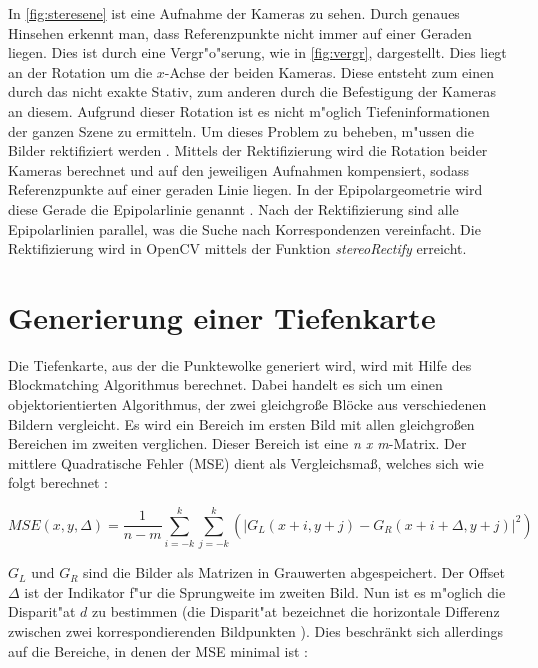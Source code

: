 \noindent In \ref{fig:steresene} ist eine Aufnahme der Kameras zu sehen. Durch genaues Hinsehen erkennt man, dass Referenzpunkte nicht immer auf einer Geraden liegen. Dies ist durch eine Vergr"o"serung, wie in \ref{fig:vergr}, dargestellt. Dies liegt an der Rotation um die $x$-Achse der beiden Kameras. Diese entsteht zum einen durch das nicht exakte Stativ, zum anderen durch die Befestigung der Kameras an diesem. Aufgrund dieser Rotation ist es nicht m"oglich Tiefeninformationen der ganzen Szene zu ermitteln. Um dieses Problem zu beheben, m"ussen die Bilder rektifiziert werden \cite{zbs}. Mittels der Rektifizierung wird die Rotation beider Kameras berechnet und auf den jeweiligen Aufnahmen kompensiert, sodass Referenzpunkte auf einer geraden Linie liegen. In der Epipolargeometrie wird diese Gerade die Epipolarlinie genannt \cite{ocvs} \cite{wepi}. Nach der Rektifizierung sind alle Epipolarlinien parallel, was die Suche nach Korrespondenzen vereinfacht. Die Rektifizierung wird in OpenCV mittels der Funktion \textit{stereoRectify} erreicht.

\section{Generierung einer Tiefenkarte} 
\label{sec:gernerierungdep}

Die Tiefenkarte, aus der die Punktewolke generiert wird, wird mit Hilfe des Blockmatching Algorithmus berechnet. Dabei handelt es sich um einen objektorientierten Algorithmus, der zwei gleichgroße Blöcke aus verschiedenen Bildern vergleicht. Es wird ein Bereich im ersten Bild mit allen gleichgroßen Bereichen im zweiten verglichen. Dieser Bereich ist eine \textit{n x m}-Matrix. Der mittlere Quadratische Fehler (MSE) dient als Vergleichsmaß, welches sich wie folgt berechnet \cite{HAW}:

\begin{equation}
MSE(x,y,\Delta) = \dfrac{1}{n-m} \sum_{i=-k}^k \sum_{j=-k}^k (|G_{L}(x+i, y+j) - G_{R}(x+i+\Delta, y+j)|^2)
\end{equation}

\noindent $G_{L}$ und $G_{R}$ sind die Bilder als Matrizen in Grauwerten abgespeichert. Der Offset $\Delta$ ist der Indikator f"ur die Sprungweite im zweiten Bild. Nun ist es m"oglich die Disparit"at $d$ zu bestimmen (die Disparit"at bezeichnet die horizontale Differenz zwischen zwei korrespondierenden Bildpunkten \cite{disp}). Dies beschränkt sich allerdings auf die Bereiche, in denen der MSE minimal ist \cite{HAW}:


